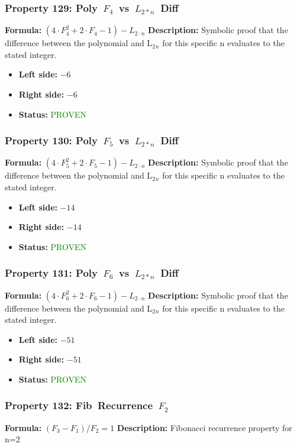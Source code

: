 \subsubsection*{Property 129: Poly~$F_{4}$~vs~$L_{{2*n}}$~Diff}
\textbf{Formula:} $(4 \cdot F_4^2+2 \cdot F_4-1) - L_{2 \cdot n}$
\textbf{Description:} Symbolic proof that the difference between the polynomial and L$_2$$_n$ for this specific n evaluates to the stated integer.

\begin{itemize}
\item \textbf{Left side:} $-6$
\item \textbf{Right side:} $-6$
\item \textbf{Status:} \textcolor{green}{PROVEN}
\end{itemize}

\subsubsection*{Property 130: Poly~$F_{5}$~vs~$L_{{2*n}}$~Diff}
\textbf{Formula:} $(4 \cdot F_5^2+2 \cdot F_5-1) - L_{2 \cdot n}$
\textbf{Description:} Symbolic proof that the difference between the polynomial and L$_2$$_n$ for this specific n evaluates to the stated integer.

\begin{itemize}
\item \textbf{Left side:} $-14$
\item \textbf{Right side:} $-14$
\item \textbf{Status:} \textcolor{green}{PROVEN}
\end{itemize}

\subsubsection*{Property 131: Poly~$F_{6}$~vs~$L_{{2*n}}$~Diff}
\textbf{Formula:} $(4 \cdot F_6^2+2 \cdot F_6-1) - L_{2 \cdot n}$
\textbf{Description:} Symbolic proof that the difference between the polynomial and L$_2$$_n$ for this specific n evaluates to the stated integer.

\begin{itemize}
\item \textbf{Left side:} $-51$
\item \textbf{Right side:} $-51$
\item \textbf{Status:} \textcolor{green}{PROVEN}
\end{itemize}

\subsubsection*{Property 132: Fib~Recurrence~$F_{2}$}
\textbf{Formula:} $(F_3-F_1)/F_2=1$
\textbf{Description:} Fibonacci recurrence property for n=2

